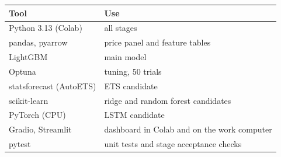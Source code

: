 \begin{tabular}{lp{8cm}}
\toprule
\textbf{Tool} & \textbf{Use} \\
\midrule
Python 3.13 (Colab) & all stages \\
pandas, pyarrow & price panel and feature tables \\
LightGBM & main model \\
Optuna & tuning, 50 trials \\
statsforecast (AutoETS) & ETS candidate \\
scikit-learn & ridge and random forest candidates \\
PyTorch (CPU) & LSTM candidate \\
Gradio, Streamlit & dashboard in Colab and on the work computer \\
pytest & unit tests and stage acceptance checks \\
\bottomrule
\end{tabular}
